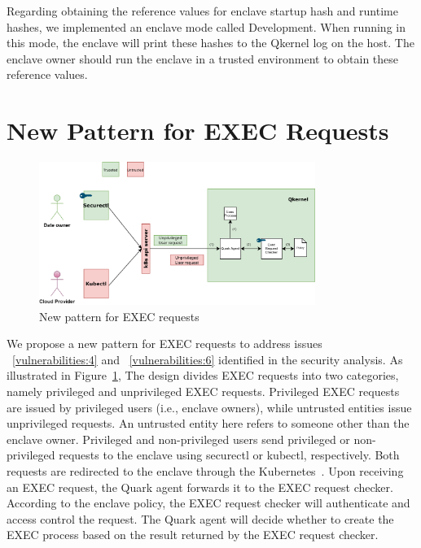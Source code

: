 Regarding obtaining the reference values for enclave startup hash and runtime hashes, we implemented an enclave mode called Development. When running in this mode, the enclave will print these hashes to the Qkernel log on the host. The enclave owner should run the enclave in a trusted environment to obtain these reference values.

\section{New Pattern for EXEC Requests}
\label{sec:design_EXEC_Requests}
\begin{figure}[!htb]
    \centering
    \includegraphics[width=0.8\textwidth]{images/new_pattern_of_exec.png}
    \caption[New pattern for EXEC requests]{New pattern for EXEC requests}
    \label{fig:new_pattern_of_exec}
\end{figure}

We propose a new pattern for EXEC requests to address issues ~\ref{vulnerabilities:4} and ~\ref{vulnerabilities:6} identified in the security analysis. As illustrated in Figure~\ref{fig:new_pattern_of_exec}, The design divides EXEC requests into two categories, namely privileged and unprivileged EXEC requests. 
Privileged EXEC requests are issued by privileged users (i.e., enclave owners), while untrusted entities issue unprivileged requests. An untrusted entity here refers to someone other than the enclave owner. Privileged and non-privileged users send privileged or non-privileged requests to the enclave using securectl or kubectl, respectively. Both requests
are redirected to the enclave through the Kubernetes~\cite*{k8s}. Upon receiving an EXEC request, the Quark agent forwards it to the EXEC request checker. According to the enclave policy, the EXEC request checker will authenticate and access control the request. The Quark agent will decide whether to create the 
EXEC process based on the result returned by the EXEC request checker.

